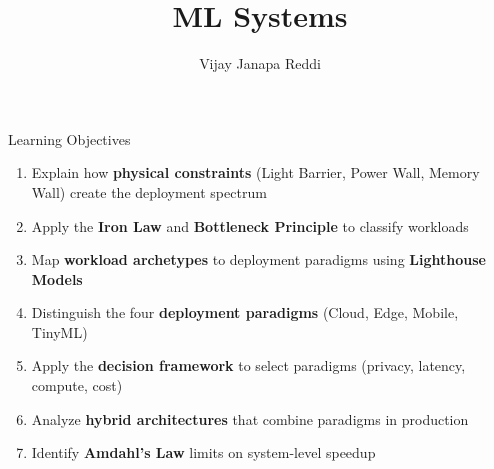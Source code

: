 \documentclass[aspectratio=169, 12pt]{beamer}
\title{ML Systems}
\author{Vijay Janapa Reddi}
\institute{Harvard University}
\date{}
\begin{document}

\begin{frame}{Learning Objectives}
\note{
%
%
}

\footnotesize
\begin{enumerate}\setlength\itemsep{0pt}
  \item Explain how \textbf{physical constraints} (Light Barrier, Power Wall, Memory Wall) create the deployment spectrum
  \item Apply the \textbf{Iron Law} and \textbf{Bottleneck Principle} to classify workloads
  \item Map \textbf{workload archetypes} to deployment paradigms using \textbf{Lighthouse Models}
  \item Distinguish the four \textbf{deployment paradigms} (Cloud, Edge, Mobile, TinyML)
  \item Apply the \textbf{decision framework} to select paradigms (privacy, latency, compute, cost)
  \item Analyze \textbf{hybrid architectures} that combine paradigms in production
  \item Identify \textbf{Amdahl's Law} limits on system-level speedup
\end{enumerate}

\end{frame}
\end{document}
